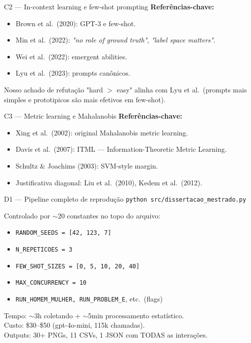 \documentclass[aspectratio=169,10pt]{beamer}
\begin{document}
\begin{frame}{C2 --- In-context learning e few-shot prompting}
  \footnotesize
  \textbf{Refer\^encias-chave:}
  \begin{itemize}
    \item Brown et al.\ (2020): GPT-3 e few-shot.
    \item Min et al.\ (2022): \emph{"no role of ground truth"}, \emph{"label space matters"}.
    \item Wei et al.\ (2022): emergent abilities.
    \item Lyu et al.\ (2023): prompts can\^onicos.
  \end{itemize}
  \medskip
  Nosso achado de refuta\c{c}\~ao "hard $>$ easy" alinha com Lyu et al.\ (prompts mais simples e prototipicos s\~ao mais efetivos em few-shot).
\end{frame}

\begin{frame}{C3 --- Metric learning e Mahalanobis}
  \footnotesize
  \textbf{Refer\^encias-chave:}
  \begin{itemize}
    \item Xing et al.\ (2002): original Mahalanobis metric learning.
    \item Davis et al.\ (2007): ITML --- Information-Theoretic Metric Learning.
    \item Schultz \& Joachims (2003): SVM-style margin.
    \item Justificativa diagonal: Liu et al.\ (2010), Kedem et al.\ (2012).
  \end{itemize}
\end{frame}

\begin{frame}{D1 --- Pipeline completo de reprodu\c{c}\~ao}
  \footnotesize
  \texttt{python src/dissertacao\_mestrado.py}
  \medskip

  Controlado por $\sim$20 constantes no topo do arquivo:
  \begin{itemize}
    \item \texttt{RANDOM\_SEEDS = [42, 123, 7]}
    \item \texttt{N\_REPETICOES = 3}
    \item \texttt{FEW\_SHOT\_SIZES = [0, 5, 10, 20, 40]}
    \item \texttt{MAX\_CONCURRENCY = 10}
    \item \texttt{RUN\_HOMEM\_MULHER, RUN\_PROBLEM\_E}, etc.\ (flags)
  \end{itemize}
  \medskip
  Tempo: $\sim$3h coletando + $\sim$5min processamento estat\'istico.\\
  Custo: \$30--\$50 (gpt-4o-mini, 115k chamadas).\\
  Outputs: 30+ PNGs, 11 CSVs, 1 JSON com TODAS as intera\c{c}\~oes.
\end{frame}
\end{document}
